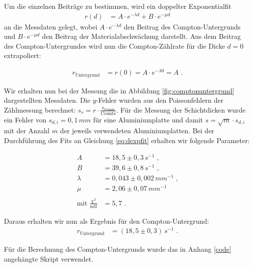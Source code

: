 Um die einzelnen Beiträge zu bestimmen, wird ein doppelter Exponentialfit
\begin{align}
	r(d)&=A\cdot e^{-\lambda d}+B\cdot e^{-\mu d}
\end{align}
an die Messdaten gelegt, wobei $A\cdot e^{-\lambda d}$ den Beitrag des Compton-Untergrunds und $B\cdot e^{-\mu d}$ den Beitrag der Materialabschwächung darstellt. Aus dem Beitrag des Compton-Untergrundes wird nun die Compton-Zählrate für die Dicke $d=0$ extrapoliert:

\begin{align}
	r_\text{Untergrund}&=r(0)=A\cdot e^{-\lambda 0}=A\text{ .}\label{eq:dexpfit}
\end{align}


Wir erhalten nun bei der Messung die in Abbildung \ref{fig:comptonuntergrund} dargestellten Messdaten. Die $y$-Fehler wurden aus den Poissonfehlern der Zählmessung berechnet: $s_r=r\cdot\frac{s_\text{Counts}}{\mathrm{Counts}}$. Für die Messung der Schichtdicken wurde ein Fehler von $s_{d,i}=0,1\,\si{mm}$ für eine Aluminiumplatte und damit $s=\sqrt{m}\cdot s_{d,i}$ mit der Anzahl $m$ der jeweils verwendeten Aluminiumplatten. Bei der Durchführung des Fits an Gleichung \ref{eq:dexpfit} erhalten wir folgende Parameter:

\begin{align*}
		A&=18,5\pm0,3\,\si{s^{-1}}\text{ ,}\\
		B&=39,6\pm0,8\,\si{s^{-1}}\text{ ,}\\
		\lambda&=0,043\pm0,002\,\si{mm^{-1}}\text{ ,}\\
		\mu&=2,06\pm0,07\,\si{mm^{-1}}\\
		\ \\
		\text{mit }\frac{\chi^2}{\mathrm{ndf}}&=5,7\text{ .}
\end{align*}

Daraus erhalten wir nun als Ergebnis für den Compton-Untergrund:
\begin{align}
	r_\text{Untergrund}&=(18,5\pm0,3)\,\si{s^{-1}}\text{ .}
\end{align}

Für die Berechnung des Compton-Untergrunds wurde das in Anhang \ref{code} angehängte Skript   verwendet.

